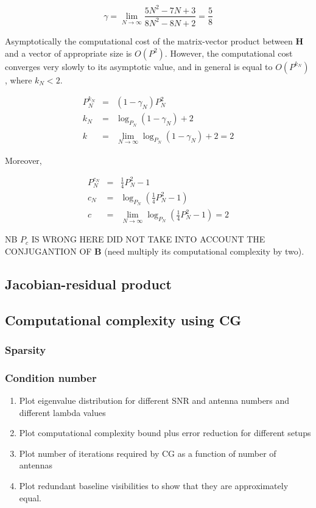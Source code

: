 \documentclass[a4paper,fleqn,usenatbib]{mnras}
\begin{document}
\begin{equation}
\gamma = \lim_{N\rightarrow \infty}\frac{5N^2-7N+3}{8N^2-8N+2} = \frac{5}{8}
\end{equation}

Asymptotically the computational cost of the matrix-vector product between $\boldsymbol{H}$ and a vector of appropriate size is $O(P^2)$. However, the computational cost converges 
very slowly to its asymptotic value, and in general is equal to $O(P^{k_N})$, where $k_N < 2$.

\begin{eqnarray}
P^{k_N}_N &=& (1 - \gamma_N)P^2_N\\
k_N &=& \log_{P_N}(1 - \gamma_N) + 2\\
k &=& \lim_{N\rightarrow \infty} \log_{P_N}(1 - \gamma_N) + 2 = 2
\end{eqnarray}

Moreover,

\begin{eqnarray}
P^{c_N}_N &=& \frac{1}{4} P_N^2 -1\\
c_N &=& \log_{P_N}\left (\frac{1}{4} P_N^2-1 \right )\\
c &=& \lim_{N\rightarrow \infty} \log_{P_N}\left (\frac{1}{4} P_N^2-1\right ) = 2
\end{eqnarray}

NB $P_c$ IS WRONG HERE DID NOT TAKE INTO ACCOUNT THE CONJUGANTION OF $\boldsymbol{B}$ (need multiply its computational complexity by two).

\subsection{Jacobian-residual product}

\subsection{Computational complexity using CG}
\subsubsection{Sparsity}
\subsubsection{Condition number}

\begin{enumerate}
 \item Plot eigenvalue distribution for different SNR and antenna numbers and different lambda values
 \item Plot computational complexity bound plus error reduction for different setups
 \item Plot number of iterations required by CG as a function of number of antennas
 \item Plot redundant baseline visibilities to show that they are approximately equal.
\end{enumerate}
\end{document}
